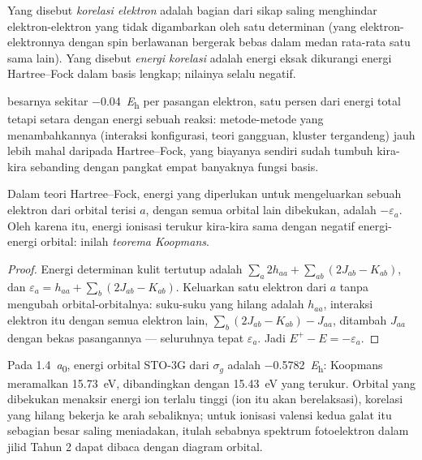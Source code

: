\begin{definition}\label{def:b3:computational-chemistry:correlation}
Yang disebut \emph{korelasi elektron} adalah bagian
dari sikap saling menghindar elektron-elektron yang tidak digambarkan oleh
satu determinan (yang elektron-elektronnya dengan spin berlawanan bergerak
bebas dalam medan rata-rata satu sama lain). Yang disebut \emph{energi
korelasi} adalah energi eksak dikurangi energi
Hartree--Fock dalam basis lengkap; nilainya selalu negatif.
\end{definition}

 besarnya sekitar \qty{-0.04}{\hartree} per pasangan
elektron, satu persen dari energi total tetapi setara dengan energi sebuah
reaksi: metode-metode yang menambahkannya (interaksi konfigurasi, teori
gangguan, kluster tergandeng) jauh lebih mahal daripada Hartree--Fock, yang
biayanya sendiri sudah tumbuh kira-kira sebanding dengan pangkat empat
banyaknya fungsi basis.

\begin{theorem}\label{thm:b3:computational-chemistry:koopmans}
Dalam teori Hartree--Fock, energi yang diperlukan untuk mengeluarkan sebuah
elektron dari orbital terisi $a$, dengan semua orbital lain dibekukan, adalah
$-\varepsilon_a$. Oleh karena itu, energi ionisasi terukur kira-kira sama
dengan negatif energi-energi orbital: inilah \emph{teorema
Koopmans}.
\end{theorem}

\begin{proof}
Energi determinan kulit tertutup adalah $\sum_a2h_{aa} + \sum_{ab}(2J_{ab} -
K_{ab})$, dan $\varepsilon_a = h_{aa} + \sum_b(2J_{ab} - K_{ab})$. Keluarkan satu
elektron dari $a$ tanpa mengubah orbital-orbitalnya: suku-suku yang hilang
adalah $h_{aa}$, interaksi elektron itu dengan semua elektron lain,
$\sum_b(2J_{ab} - K_{ab}) -
J_{aa}$, ditambah $J_{aa}$ dengan bekas
pasangannya --- seluruhnya tepat $\varepsilon_a$. Jadi
$E^+ - E = -\varepsilon_a$.
\end{proof}

\begin{example}[Mengionkan \ce{H2}]\label{ex:b3:computational-chemistry:koopmans}
Pada \qty{1.4}{\bohr}, energi orbital STO-3G dari $\sigma_g$ adalah
\qty{-0.5782}{\hartree}: Koopmans meramalkan \qty{15.73}{eV}, dibandingkan
dengan \qty{15.43}{eV} yang terukur. Orbital yang dibekukan menaksir energi
ion terlalu tinggi (ion itu akan berelaksasi), korelasi yang hilang bekerja ke
arah sebaliknya; untuk ionisasi valensi kedua galat itu sebagian besar saling
meniadakan, itulah sebabnya spektrum fotoelektron dalam jilid Tahun 2 dapat
dibaca dengan diagram orbital.
\end{example}

